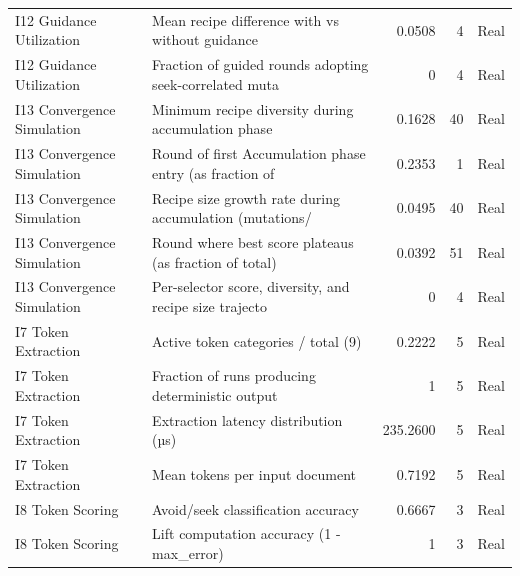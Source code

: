 \begin{table}[htbp]
\begin{tabular}{@{}llrrl@{}}
I12 Guidance Utilization & Mean recipe difference with vs without guidance & 0.0508 & 4 & Real \\
I12 Guidance Utilization & Fraction of guided rounds adopting seek-correlated muta & 0 & 4 & Real \\
I13 Convergence Simulation & Minimum recipe diversity during accumulation phase & 0.1628 & 40 & Real \\
I13 Convergence Simulation & Round of first Accumulation phase entry (as fraction of & 0.2353 & 1 & Real \\
I13 Convergence Simulation & Recipe size growth rate during accumulation (mutations/ & 0.0495 & 40 & Real \\
I13 Convergence Simulation & Round where best score plateaus (as fraction of total) & 0.0392 & 51 & Real \\
I13 Convergence Simulation & Per-selector score, diversity, and recipe size trajecto & 0 & 4 & Real \\
I7 Token Extraction & Active token categories / total (9) & 0.2222 & 5 & Real \\
I7 Token Extraction & Fraction of runs producing deterministic output & 1 & 5 & Real \\
I7 Token Extraction & Extraction latency distribution (µs) & 235.2600 & 5 & Real \\
I7 Token Extraction & Mean tokens per input document & 0.7192 & 5 & Real \\
I8 Token Scoring & Avoid/seek classification accuracy & 0.6667 & 3 & Real \\
I8 Token Scoring & Lift computation accuracy (1 - max\_error) & 1 & 3 & Real \\
\bottomrule
\end{tabular}
\end{table}
